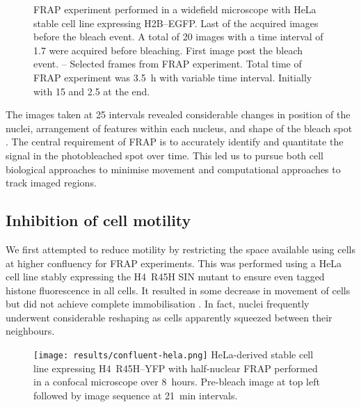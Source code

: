 \begin{figure}
        {
          FRAP experiment performed in a widefield microscope with
          HeLa stable cell line expressing H2B--EGFP.
          Last of the acquired images before the bleach event.  A
          total of 20 images with a time interval of \SI{1.7}{\sec}
          were acquired before bleaching.
          First image post the bleach event.
          --
          Selected frames from FRAP experiment.  Total time of FRAP
          experiment was \SI{3.5}{\hour} with variable time interval.
          Initially with \SI{15}{\sec} and \SI{2.5}{\min} at the end.
        }
      \label{fig:kill-frap:cell-movement}
    \end{figure}

    The images taken at \SI{25}{\min} intervals revealed considerable changes
    in position of the nuclei, arrangement of features within each nucleus,
    and shape of the bleach spot .
    The central requirement of FRAP is to accurately identify and
    quantitate the signal in the photobleached spot over time.
    This led us to pursue both cell biological approaches to minimise movement
    and computational approaches to track imaged regions.

  \subsection{Inhibition of cell motility}

    We first attempted to reduce motility by restricting the space available
    using cells at higher confluency for FRAP experiments.
    This was performed using a HeLa cell line stably expressing 
    the H4~R45H SIN mutant to ensure even tagged histone fluorescence in all cells.
    It resulted in some decrease in movement of cells
    but did not achieve complete immobilisation .
    In fact, nuclei frequently underwent considerable reshaping as cells 
    apparently squeezed between their neighbours.

    \begin{figure}
      \centering
      \texttt{[image: results/confluent-hela.png]}
        {
          HeLa-derived stable cell line expressing H4~R45H--YFP
          with half-nuclear FRAP performed in a confocal microscope over 8~hours.
          Pre-bleach image at top left followed by image sequence at 21~min intervals.
        }
      \label{fig:kill-frap:confluent-hela}
    \end{figure}


